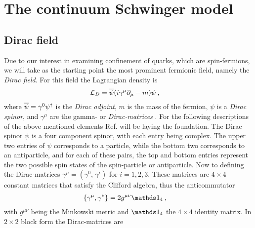 \documentclass[../main.tex]{subfiles} %
\begin{document}
\section{The continuum Schwinger model} \label{Sec:ContinuumSchwingerModel}




\subsection{Dirac field} \label{sec:DiracField}

Due to our interest in examining confinement of quarks, which are spin-\half fermions, we will take as the starting point the most prominent fermionic field, namely the \emph{Dirac field}. For this field the Lagrangian density is
\begin{align} \label{eq:DiracLagrangiangDensity}
    \mathcal{L}_D &= \overline{\psi} (i \gamma^\mu \partial_\mu - m) \psi \: ,
\end{align}
where $\psibar = \gamma^0 \psi\dagger$ is the \emph{Dirac adjoint}, $m$ is the mass of the fermion, $\psi$ is a \emph{Dirac spinor}, and $\gamma^\mu$ are the gamma- or \emph{Dirac-matrices} \cite{peskin_introToQFT_1995,sakurai_modernQM_2017}. For the following descriptions of the above mentioned elements Ref. \cite{peskin_introToQFT_1995} will be laying the foundation. The Dirac spinor $\psi$ is a four component spinor, with each entry being complex. The upper two entries of $\psi$ corresponds to a particle, while the bottom two corresponds to an antiparticle, and for each of these pairs, the top and bottom entries represent the two possible spin states of the spin-\half particle or antiparticle. Now to defining the Dirac-matrices $\gamma^\mu = (\gamma^0,\, \gamma^i)$ for $i=1,2,3$. These matrices are $4 \times 4$ constant matrices that satisfy the Clifford algebra, thus the anticommutator
\begin{align}
    \anticommutator{\gamma^\mu}{\gamma^\nu} &= 2g^{\mu\nu}\id_4 \: ,
\end{align}
with $g^{\mu\nu}$ being the Minkowski metric and $\id_4$ the $4 \times 4$ identity matrix. In $2 \times 2$ block form the Dirac-matrices are
\end{document}
